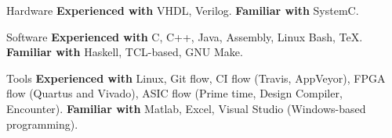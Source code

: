 
\begin{cvskills}

\cvskill
{Hardware}
{\textbf{Experienced with} VHDL, Verilog. \textbf{Familiar with} SystemC.}

\cvskill
{Software}
{\textbf{Experienced with} C, C++, Java, Assembly, Linux Bash, TeX. 
\textbf{Familiar with} Haskell, TCL-based, GNU Make.}

\cvskill
{Tools}
{\textbf{Experienced with} Linux, Git flow, CI flow (Travis, AppVeyor), FPGA 
flow (Quartus and Vivado), ASIC flow (Prime time, Design Compiler, Encounter). 
\textbf{Familiar with} Matlab, Excel, Visual Studio (Windows-based 
programming).}

\end{cvskills}